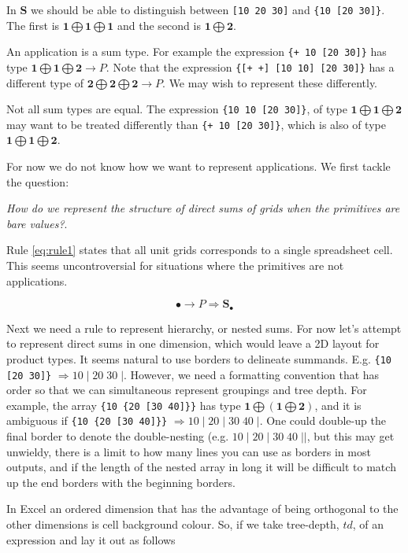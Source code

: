 \documentclass[11pt]{article}
\newcommand{\unit}{\bullet}
\newcommand{\one}{\mathbf{1}}
\newcommand{\two}{\mathbf{2}}
\newcommand{\cell}{\mathbf{S}_\bullet}
\begin{document}
In $\mathbf{S}$ we should be able to distinguish between \verb|[10 20 30]| and \verb|{10 [20 30]}|. The first is $\one \bigoplus \one \bigoplus \one$ and the second is $\one \bigoplus \two$. 

An application is a sum type. For example the expression \verb|{+ 10 [20 30]}| has type $\one \bigoplus \one \bigoplus \two \to P$. Note that the expression \verb|{[+ +] [10 10] [20 30]}| has a different type of $\two \bigoplus \two \bigoplus \two \to P$. We may wish to represent these differently. 

Not all sum types are equal. The expression \verb|{10 10 [20 30]}|,  of type $\one \bigoplus \one \bigoplus \two$ may want to be treated differently than \verb|{+ 10 [20 30]}|, which is also of type $\one \bigoplus \one \bigoplus \two$.

For now we do not know how we want to represent applications. We first tackle the question:


\textit{How do we represent the structure of direct sums of grids when the primitives are bare values?}. 

Rule \ref{eq:rule1} states that all unit grids corresponds to a single spreadsheet cell. This seems uncontroversial for situations where the primitives are not applications.

\begin{equation} 
\unit \to P \Rightarrow \cell \label{eq:rule1}
\end{equation}

Next we need a rule to represent hierarchy, or nested sums. For now let's attempt to represent direct sums in one dimension, which would leave a 2D layout for product types. It seems natural to use borders to delineate summands. E.g. \verb|{10 [20 30]}| $\Rightarrow 10 \;|\; 20 \;30\; |$. However, we need a formatting convention that has order so that we can simultaneous represent groupings and tree depth. For example, the array \verb|{10 {20 [30 40]}}| has type $\one \bigoplus (\one \bigoplus \two)$, and it is ambiguous if \verb|{10 {20 [30 40]}}| $\Rightarrow 10 \;|\; 20 \;|\; 30\; 40\; |$. One could double-up the final border to denote the double-nesting (e.g. $10 \;|\; 20 \;|\; 30\; 40\;||$, but this may get unwieldy, there is a limit to how many lines you can use as borders in most outputs, and if the length of the nested array in long it will be difficult to match up the end borders  with the beginning borders. 

In Excel an ordered dimension that has the advantage of being orthogonal to the other dimensions is cell background colour. So, if we take tree-depth, $td$, of an expression and lay it out as follows
\end{document}
